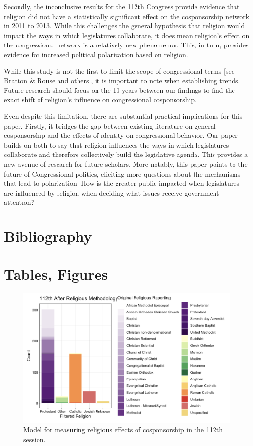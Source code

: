 \documentclass[Royal,times,sageh]{sagej}
\begin{document}
Secondly, the inconclusive results for the 112th Congress provide
evidence that religion did not have a statistically significant effect
on the cosponsorship network in 2011 to 2013. While this challenges the
general hypothesis that religion would impact the ways in which
legislatures collaborate, it does mean religion's effect on the
congressional network is a relatively new phenomenon. This, in turn,
provides evidence for increased political polarization based on
religion.

While this study is not the first to limit the scope of congressional
terms {[}see Bratton \& Rouse and others{]}, it is important to note
when establishing trends. Future research should focus on the 10 years
between our findings to find the exact shift of religion's influence on
congressional cosponsorship.

Even despite this limitation, there are substantial practical
implications for this paper. Firstly, it bridges the gap between
existing literature on general cosponsorship and the effects of identity
on congressional behavior. Our paper builds on both to say that religion
influences the ways in which legislatures collaborate and therefore
collectively build the legislative agenda. This provides a new avenue of
research for future scholars. More notably, this paper points to the
future of Congressional politics, eliciting more questions about the
mechanisms that lead to polarization. How is the greater public impacted
when legislatures are influenced by religion when deciding what issues
receive government attention?

\hypertarget{bibliography}{%
\section{Bibliography}\label{bibliography}}

\hypertarget{tables-figures}{%
\section{Tables, Figures}\label{tables-figures}}

\begin{figure}

{\centering \includegraphics[width=0.7\linewidth]{images/112th_religious} 

}

\caption{Model for measuring religious effects of cosponsorship in the 112th session.\label{table1}}\label{fig:table1}
\end{figure}
\end{document}
